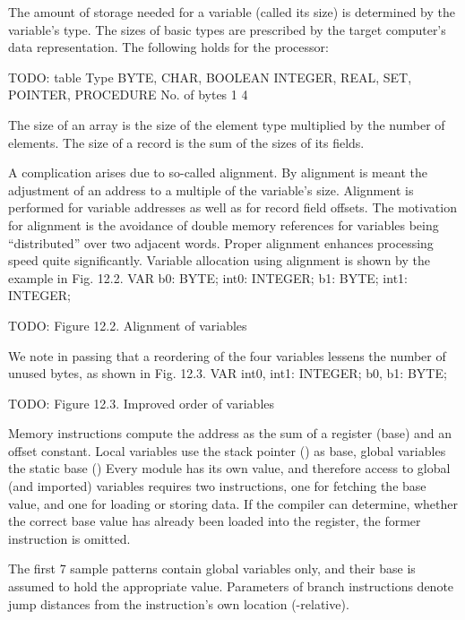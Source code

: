 The amount of storage needed for a variable (called its size) is determined by the variable's type. The sizes of basic types are prescribed by the target computer's data representation. The following holds for the  processor:

TODO: table
Type
BYTE, CHAR, BOOLEAN
INTEGER, REAL, SET, POINTER, PROCEDURE
No. of bytes
1 4

\noindent The size of an array is the size of the element type multiplied by the number of elements. The size of a record is the sum of the sizes of its fields.

A complication arises due to so-called alignment. By alignment is meant the adjustment of an address to a multiple of the variable's size. Alignment is performed for variable addresses as well as for record field offsets. The motivation for alignment is the avoidance of double memory references for variables being ``distributed'' over two adjacent words. Proper alignment enhances processing speed quite significantly. Variable allocation using alignment is shown by the example in Fig. 12.2.
\begintt
VAR b0: BYTE; int0: INTEGER; b1: BYTE; int1: INTEGER;
\endtt

TODO: Figure 12.2. Alignment of variables

\noindent We note in passing that a reordering of the four variables lessens the number of unused bytes, as shown in Fig. 12.3.
\begintt
VAR int0, int1: INTEGER; b0, b1: BYTE;
\endtt

TODO: Figure 12.3. Improved order of variables

Memory instructions compute the address as the sum of a register (base) and an offset constant. Local variables use the stack pointer  () as base, global variables the static base  () Every module has its own  value, and therefore access to global (and imported) variables requires two instructions, one for fetching the base value, and one for loading or storing data. If the compiler can determine, whether the correct base value has already been loaded into the  register, the former instruction is omitted.

The first 7 sample patterns contain global variables only, and their base  is assumed to hold the appropriate value. Parameters of branch instructions denote jump distances from the instruction's own location (-relative).

